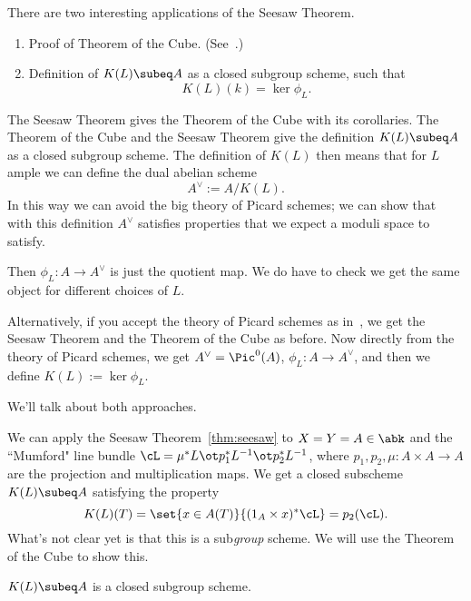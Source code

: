 There are two interesting applications of the Seesaw Theorem.
\begin{enumerate}
\item
Proof of Theorem of the Cube. (See~\cite[\S 6]{Mu70}.)
\item
Definition of $K(L)\subeq A$ as a closed subgroup scheme, such that
\[
K(L)(k)=\ker\phi_L.
\]
\end{enumerate}
\begin{rem}
The Seesaw Theorem gives the Theorem of the Cube with its corollaries. The Theorem of the Cube and the Seesaw Theorem  give the definition $K(L)\subeq A$ as a closed subgroup scheme. The definition of $K(L)$ then means that for $L$ ample we can define the dual abelian scheme
\[
A^{\vee}:=A/K(L).
\]
In this way we can avoid the big theory of Picard schemes; we can show that with this definition $A^{\vee}$ satisfies properties that we expect a moduli space to satisfy. 

Then $\phi_L:A\to A^{\vee}$ is just the quotient map. We do have to check we get the same object for different choices of $L$.

Alternatively, if you accept the theory of Picard schemes as in~\cite{GGBM}, we get the Seesaw Theorem and the Theorem of the Cube as before. Now directly from the theory of Picard schemes, we get $A^{\vee}=\Pic^0(A)$, $\phi_L:A\to A^{\vee}$, and then we define $K(L):=\ker \phi_L$. 

We'll talk about both approaches.
\end{rem}
We can apply the Seesaw Theorem~\ref{thm:seesaw} to $X=Y=A\in \abk$ and the ``Mumford" line bundle $\cL=\mu^*L\ot p_1^*L^{-1}\ot p_2^* L^{-1}$, where $p_1,p_2,\mu:A\times A\to A$ are the projection and multiplication maps. We get a closed subscheme $K(L)\subeq A$ satisfying the property
\[
K(L)(T)=\set{x\in A(T)}{(1_A\times x)^* \cL}=p_2(\cL).
\]
What's not clear yet is that this is a sub{\it group} scheme. We will use the Theorem of the Cube to show this.
\begin{lem}
$K(L)\subeq A$ is a closed subgroup scheme.
\end{lem}
